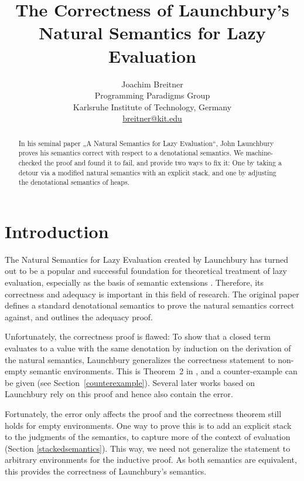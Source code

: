 \documentclass[twopage]{scrartcl}
\title%
      {The Correctness of Launchbury's Natural Semantics for Lazy Evaluation}
\author%
        {Joachim Breitner\\ %
	\small{Programming Paradigms Group}\\
        \small{Karlsruhe Institute of Technology, Germany}\\
        \small{\url{breitner@kit.edu}}}
\theoremstyle{nonumberbreak}
\newcommand{\shortcite}{\cite}
\begin{document}
\label{firstpage}

\maketitle

\begin{abstract}
In his seminal paper „A Natural Semantics for Lazy Evaluation“, John Launchbury
proves his semantics correct with respect to a denotational semantics. We
machine-checked the proof and found it to fail, and provide two ways to fix it:
One by taking a detour via a modified natural semantics with an explicit stack,
and one by adjusting the denotational semantics of heaps.
\end{abstract}

\tableofcontents

\section{Introduction}

The Natural Semantics for Lazy Evaluation created by Launchbury \shortcite{launchbury} has turned out to be a popular and successful foundation for theoretical treatment of lazy evaluation, especially as the basis of semantic extensions \cite{nakata, nakata_blackhole, distributed, mixed, parallel}. Therefore, its correctness and adequacy is important in this field of research. The original paper defines a standard denotational semantics to prove the natural semantics correct against, and outlines the adequacy proof.

Unfortunately, the correctness proof is flawed: To show that a closed term evaluates to a value with the same denotation by induction on the derivation of the natural semantics, Launchbury generalizes the correctness statement to non-empty semantic environments. This is Theorem~2 in \cite{launchbury}, and a counter-example can be given (see Section~\ref{counterexample}). Several later works based on Launchbury rely on this proof and hence also contain the error.

Fortunately, the error only affects the proof and the correctness theorem still holds for empty environments. One way to prove this is to add an explicit stack to the judgments of the semantics, to capture more of the context of evaluation (Section \ref{stackedsemantics}). This way, we need not generalize the statement to arbitrary environments for the inductive proof. As both semantics are equivalent, this provides the correctness of Launchbury's semantics.
\end{document}

